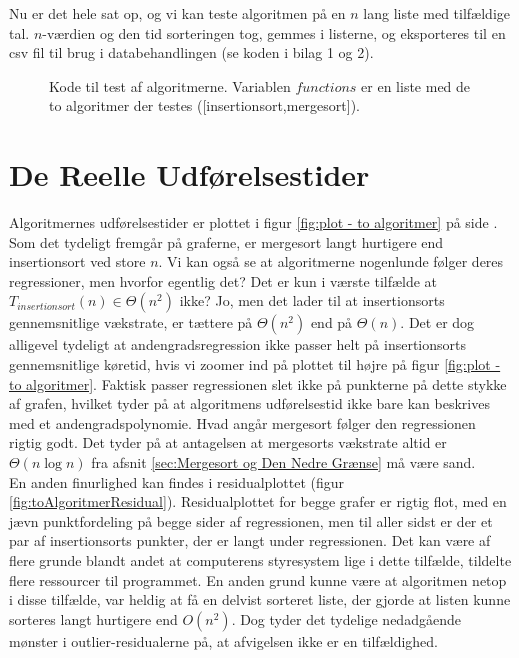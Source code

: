 Nu er det hele sat op, og vi kan teste algoritmen på en $n$ lang liste med tilfældige tal. $n$-værdien og den tid sorteringen tog, gemmes i listerne, og eksporteres til en csv fil til brug i databehandlingen (se koden i bilag 1 og 2).

\begin{figure}
	\begin{center}
		
	\end{center}
	\caption{Kode til test af algoritmerne. Variablen $functions$ er en liste med de to algoritmer der testes ([insertionsort,mergesort]).}
	\label{fig:Kode til test af algoritmerne}
\end{figure}



\section{De Reelle Udførelsestider}
\label{sec:De Reelle Køretider}

Algoritmernes udførelsestider er plottet i figur \ref{fig:plot - to algoritmer} på side \pageref{fig:plot - to algoritmer}.\\

Som det tydeligt fremgår på graferne, er mergesort langt hurtigere end insertionsort ved store $n$. Vi kan også se at algoritmerne nogenlunde følger deres regressioner, men hvorfor egentlig det? Det er kun i værste tilfælde at $T_{insertionsort}(n) \in \Theta (n^2)$ ikke? Jo, men det lader til at insertionsorts gennemsnitlige vækstrate, er tættere på $\Theta (n^2)$ end på $\Theta (n)$. Det er dog alligevel tydeligt at andengradsregression ikke passer helt på insertionsorts gennemsnitlige køretid, hvis vi zoomer ind på plottet til højre på figur \ref{fig:plot - to algoritmer}. Faktisk passer regressionen slet ikke på punkterne på dette stykke af grafen, hvilket tyder på at algoritmens udførelsestid ikke bare kan beskrives med et andengradspolynomie. Hvad angår mergesort følger den regressionen rigtig godt. Det tyder på at antagelsen at mergesorts vækstrate altid er $\Theta (n \log n)$ fra afsnit \ref{sec:Mergesort og Den Nedre Grænse} må være sand.\\

En anden finurlighed kan findes i residualplottet (figur \ref{fig:toAlgoritmerResidual}). Residualplottet for begge grafer er rigtig flot, med en jævn punktfordeling på begge sider af regressionen, men til aller sidst er der et par af insertionsorts punkter, der er langt under regressionen. Det kan være af flere grunde blandt andet at computerens styresystem lige i dette tilfælde, tildelte flere ressourcer til programmet. En anden grund kunne være at algoritmen netop i disse tilfælde, var heldig at få en delvist sorteret liste, der gjorde at listen kunne sorteres langt hurtigere end $O(n^2)$. Dog tyder det tydelige nedadgående mønster i outlier-residualerne på, at afvigelsen ikke er en tilfældighed.\\


